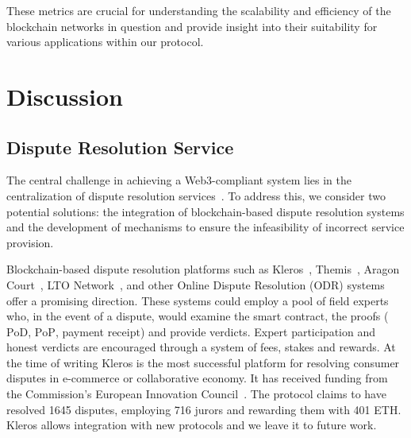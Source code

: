 \documentclass[pdftex,twocolumn,epjc3]{svjour3}
\begin{document}


These metrics are crucial for understanding the scalability and efficiency of the blockchain networks in question and provide insight into their suitability for various applications within our protocol.
\section{Discussion}
\label{sec:discussion}

\subsection{Dispute Resolution Service}\label{sec:decentralised-justice}

\begin{sloppypar}
The central challenge in achieving a Web3-compliant system lies in the centralization of dispute resolution services~\cite{ethereumWhatWeb3Why2023}. To address this, we consider two potential solutions: the integration of blockchain-based dispute resolution systems and the development of mechanisms to ensure the infeasibility of incorrect service provision.
\end{sloppypar}

Blockchain-based dispute resolution platforms such as  Kleros~\cite{bergollaKlerosSociolegalCase2022, nappertDecentralizedJusticeReinventing2020, gudkovCrowdArbitrationBlockchain2020}, Themis~\cite{mengThemisDecentralizedEscrow2019}, Aragon Court~\cite{AragonWhitepaper2023,aragonDecentralizedDisputeResolution}, LTO Network~\cite{ltonetworkNextGenBlockchainB2B}, and other Online Dispute Resolution (ODR) systems~\cite{allenGovernanceBlockchainDispute2019, lingwallShouldCodeBe2019} offer a promising direction. These systems could employ a pool of field experts who, in the event of a dispute, would examine the smart contract, the proofs ( $\mathrm{PoD}$, $\mathrm{PoP}$, payment $\mathrm{receipt}$) and provide verdicts. Expert participation and honest verdicts are encouraged through a system of fees, stakes and rewards. At the time of writing Kleros is the most successful platform for resolving consumer disputes in e-commerce or collaborative economy. It has received funding from the Commission's European Innovation Council~\cite{CommissionEuropeanInnovation2020}. The protocol claims to have resolved 1645 disputes, employing 716 jurors and rewarding them with 401 ETH. Kleros allows integration with new protocols and we leave it to future work.
\end{document}

